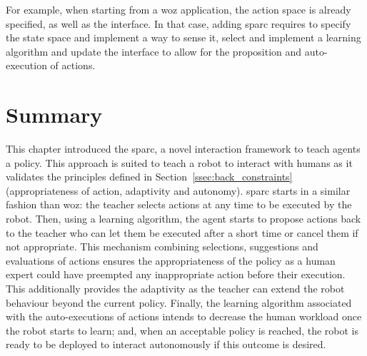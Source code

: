 For example, when starting from a \gls{woz} application, the action space is already specified, as well as the interface. In that case, adding \gls{sparc} requires to specify the state space and implement a way to sense it, select and implement a learning algorithm and update the interface to allow for the proposition and auto-execution of actions.

\section{Summary}

This chapter introduced the \acrfull{sparc}, a novel interaction framework to teach agents a policy. This approach is suited to teach a robot to interact with humans as it validates the principles defined in Section~\ref{ssec:back_constraints} (appropriateness of action, adaptivity and autonomy). \gls{sparc} starts in a similar fashion than \gls{woz}: the teacher selects actions at any time to be executed by the robot. Then, using a learning algorithm, the agent starts to propose actions back to the teacher who can let them be executed after a short time or cancel them if not appropriate. This mechanism combining selections, suggestions and evaluations of actions ensures the appropriateness of the policy as a human expert could have preempted any inappropriate action before their execution. This additionally provides the adaptivity as the teacher can extend the robot behaviour beyond the current policy. Finally, the learning algorithm associated with the auto-executions of actions intends to decrease the human workload once the robot starts to learn; and, when an acceptable policy is reached, the robot is ready to be deployed to interact autonomously if this outcome is desired.
